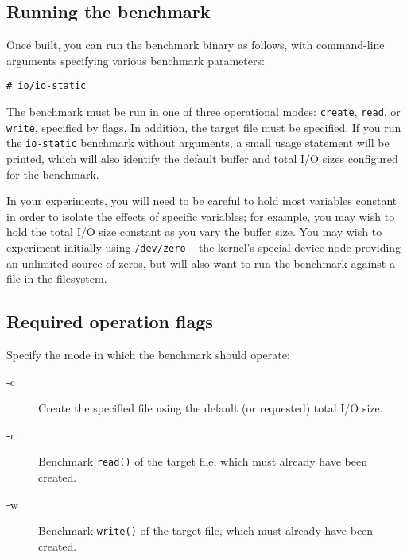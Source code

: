\documentclass[a4paper,10pt]{article}
\newcommand{\code}[1]{\texttt{\small #1}}
\begin{document}
\subsection*{Running the benchmark}

Once built, you can run the benchmark binary as follows, with
command-line arguments specifying various benchmark parameters:

\begin{lstlisting}[basicstyle=\small\ttfamily]
# io/io-static
\end{lstlisting}

%

The benchmark must be run in one of three operational modes: \texttt{create},
\texttt{read}, or \texttt{write}, specified by flags.
In addition, the target file must be specified.
If you run the \code{io-static}
benchmark without
arguments, a small usage statement will be printed, which will also identify
the default buffer and total I/O sizes configured for the benchmark.

In your experiments, you will need to be careful to hold most variables
constant in order to isolate the effects of specific variables; for example,
you may wish to hold the total I/O size constant as you vary the buffer size.
You may wish to experiment initially using \code{/dev/zero} -- the kernel's
special device node providing an unlimited source of zeros, but will also want
to run the benchmark against a file in the filesystem.

\subsection*{Required operation flags}

Specify the mode in which the benchmark should operate:

\begin{description}
\item[-c] Create the specified file using the default (or requested) total
  I/O size.

\item[-r] Benchmark \code{read()} of the target file, which must already
  have been created.

\item[-w] Benchmark \code{write()} of the target file, which must already
  have been created.
\end{description}
\end{document}
